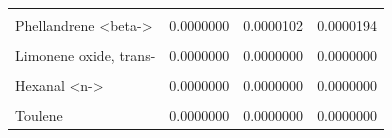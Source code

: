 \documentclass[12pt,final,CPage]{ufthesis}
\begin{document}
{\begin{table}
{\begin{tabular}[t]{lrrr}
  \cellcolor{gray!6}{Bergamotene <alpha-, cis->} & \cellcolor{gray!6}{0.0000000} & \cellcolor{gray!6}{0.0000001} & \cellcolor{gray!6}{0.0000004}\\
  \addlinespace
  Phellandrene <beta-> & 0.0000000 & 0.0000102 & 0.0000194\\
  \cellcolor{gray!6}{Terpineol <alpha->} & \cellcolor{gray!6}{0.0000000} & \cellcolor{gray!6}{0.0000000} & \cellcolor{gray!6}{0.0000000}\\
  Limonene oxide, trans- & 0.0000000 & 0.0000000 & 0.0000000\\
  \cellcolor{gray!6}{Undecane} & \cellcolor{gray!6}{0.0000000} & \cellcolor{gray!6}{0.0000000} & \cellcolor{gray!6}{0.0000000}\\
  Hexanal <n-> & 0.0000000 & 0.0000000 & 0.0000000\\
  \addlinespace
  \cellcolor{gray!6}{Napthlene, 1,6-dimethyl-4-1-methylethyl)-)} & \cellcolor{gray!6}{0.0000000} & \cellcolor{gray!6}{0.0000000} & \cellcolor{gray!6}{0.0000000}\\
  Toulene & 0.0000000 & 0.0000000 & 0.0000000\\
  \bottomrule
  \end{tabular}}
  \end{table}
  \begin{table}


\end{table}}
\end{document}
